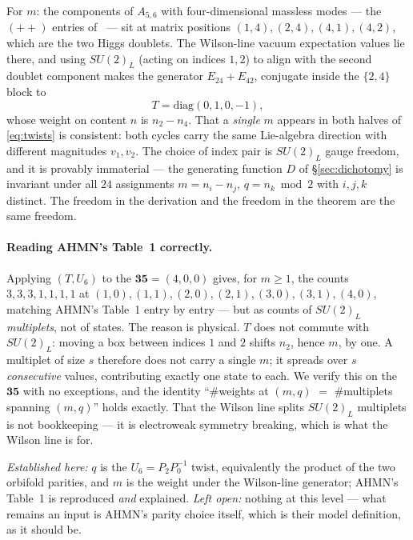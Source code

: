 \documentclass[11pt,a4paper]{article}
\begin{document}
For $m$: the components of $A_{5,6}$ with four-dimensional massless modes --- the $(++)$
entries of~\cite[Eq.~(2.12)]{AHMN} --- sit at matrix positions $(1,4),(2,4),(4,1),(4,2)$,
which are the two Higgs doublets. The Wilson-line vacuum expectation values lie there, and
using $SU(2)_L$ (acting on indices $1,2$) to align with the second doublet component makes
the generator $E_{24}+E_{42}$, conjugate inside the $\{2,4\}$ block to
\begin{equation}
T=\mathrm{diag}(0,1,0,-1),
\end{equation}
whose weight on content $n$ is $n_2-n_4$. That a \emph{single} $m$ appears in both halves of
\eqref{eq:twists} is consistent: both cycles carry the same Lie-algebra direction with
different magnitudes $v_1,v_2$. The choice of index pair is $SU(2)_L$ gauge freedom, and it
is provably immaterial --- the generating function $D$ of \S\ref{sec:dichotomy} is invariant
under all $24$ assignments $m=n_i-n_j$, $q=n_k\bmod2$ with $i,j,k$ distinct. The freedom in
the derivation and the freedom in the theorem are the same freedom.

\paragraph{Reading AHMN's Table~1 correctly.} Applying $(T,U_6)$ to the $\mathbf{35}=(4,0,0)$ gives,
for $m\ge1$, the counts $3,3,3,1,1,1,1$ at $(1,0),(1,1),(2,0),(2,1),(3,0),(3,1),(4,0)$,
matching AHMN's Table~1 entry by entry --- but as counts of $SU(2)_L$ \emph{multiplets},
not of states. The reason is physical. $T$ does not commute with $SU(2)_L$: moving a box
between indices $1$ and $2$ shifts $n_2$, hence $m$, by one. A multiplet of size $s$
therefore does not carry a single $m$; it spreads over $s$ \emph{consecutive} values,
contributing exactly one state to each. We verify this on the $\mathbf{35}$ with no
exceptions, and the identity ``\#weights at $(m,q)$ $=$ \#multiplets spanning $(m,q)$'' holds
exactly. That the Wilson line splits $SU(2)_L$ multiplets is not bookkeeping --- it is
electroweak symmetry breaking, which is what the Wilson line is for.

\emph{Established here:} $q$ is the $U_6=P_2P_0^{-1}$ twist, equivalently the product of the
two orbifold parities, and $m$ is the weight under the Wilson-line generator; AHMN's
Table~1 is reproduced \emph{and} explained. \emph{Left open:} nothing at this level --- what remains an
input is AHMN's parity choice itself, which is their model definition, as it should be.
\end{document}
